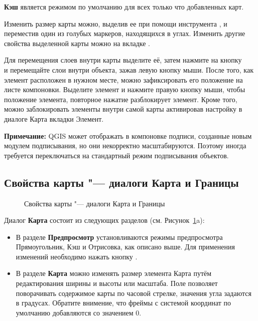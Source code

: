 \textbf{Кэш} является режимом по умолчанию для всех только что
добавленных карт.

Изменить размер карты можно, выделив ее при помощи инструмента
,
и переместив один из голубых маркеров, находящихся в углах. Изменить
другие свойства выделенной карты можно на вкладке .

Для перемещения слоев внутри карты выделите её, затем нажмите на кнопку \\
 и
перемещайте слои внутри объекта, зажав левую кнопку мыши.
После того, как элемент расположен в нужном месте, можно зафиксировать
его положение на листе компоновки. Выделите элемент и нажмите правую
кнопку мыши, чтобы  положение
элемента, повторное нажатие разблокирует элемент. Кроме того, можно
заблокировать элементы внутри самой карты активировав настройку
 в диалоге Карта вкладки
Элемент.

\textbf{Примечание:} QGIS \CURRENT может отображать в компоновке подписи,
созданные новым модулем подписывания, но они некорректно масштабируются.
Поэтому иногда требуется переключаться на стандартный режим подписывания
объектов.

\subsection{Свойства карты "--- диалоги Карта и Границы}

\begin{figure}[ht]
  \centering
    \hspace{1cm}
  \caption{Свойства карты "--- диалоги Карта и Границы \wincaption}\label{fig:mapdialog}
\end{figure}


Диалог \textbf{Карта} состоит из следующих разделов
(см. Рисунок~\ref{fig:mapdialog}a):

\begin{itemize}[label=--]
\item В разделе \textbf{Предпросмотр} установливаются режимы
предпросмотра Прямоугольник, Кэш и Отрисовка, как описано выше. Для
применения изменений необходимо нажать кнопку .
\item В разделе \textbf{Карта} можно изменять размер элемента Карта
путём редактирования ширины и высоты или масштаба. Поле
 позволяет поворачивать содержимое карты
по часовой стрелке, значения угла задаются в градусах. Обратите
внимение, что фреймы с системой координат по умолчанию добавляются со
значением 0.
\end{itemize}

